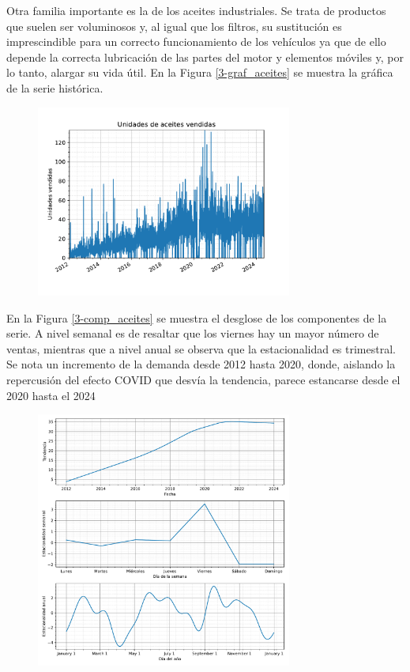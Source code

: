 Otra familia importante es la de los aceites industriales. Se trata de productos que suelen ser voluminosos y, al igual que los filtros, su sustitución es imprescindible para un correcto funcionamiento de los vehículos ya que de ello depende la correcta lubricación de las partes del motor y elementos móviles y, por lo tanto, alargar su vida útil. En la Figura \ref*{3-graf_aceites} se muestra la gráfica de la serie histórica.

\begin{figure}[H]
	{\includegraphics[width=0.75\textwidth]{imagenes/grafica_aceites.pdf}}
\end{figure}

En la Figura \ref*{3-comp_aceites} se muestra el desglose de los componentes de la serie. A nivel semanal es de resaltar que los viernes hay un mayor número de ventas, mientras que a nivel anual se observa que la estacionalidad es trimestral. Se nota un incremento de la demanda desde 2012 hasta 2020, donde, aislando la repercusión del efecto COVID que desvía la tendencia, parece estancarse desde el 2020 hasta el 2024

\begin{figure}[H]
	{\includegraphics[width=0.75\textwidth]{imagenes/comps_aceites.pdf}}
\end{figure}


